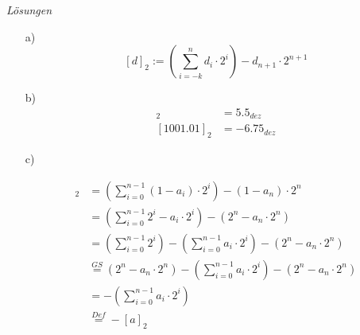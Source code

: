 \documentclass{scrartcl}[11pt]
\begin{document}
\emph{Lösungen}
\begin{itemize}
  \item[a)] $$[d]_2 := \left(\sum_{i=-k}^{n} d_i \cdot 2^i\right) - d_{n+1} \cdot 2^{n+1} $$
  \item[b)] \begin{align*}
    [0101.10]_2 &= 5.5_{dez} \\
    [1001.01]_2 &= -6.75_{dez}
  \end{align*}
  \item[c)]

  \begin{align*}
    [\bar{a}]_2 &= \left(\sum_{i=0}^{n-1} (1-a_i) \cdot 2^i\right) - (1-a_n) \cdot 2^{n}\\
    &= \left(\sum_{i=0}^{n-1}  2^i - a_i \cdot 2^i \right) - (2^n - a_n \cdot 2^n)\\
    &= \left(\sum_{i=0}^{n-1}  2^i\right) - \left(\sum_{i=0}^{n-1}a_i \cdot 2^i \right) - (2^n - a_n \cdot 2^n)\\
    &\overset{GS}{=} (2^n - a_n \cdot 2^n) - \left(\sum_{i=0}^{n-1}a_i \cdot 2^i \right) - (2^n - a_n \cdot 2^n)\\
    &= - \left(\sum_{i=0}^{n-1}a_i \cdot 2^i \right) \\
    &\overset{Def}{=} -[a]_2
  \end{align*}

\end{itemize}
\end{document}
